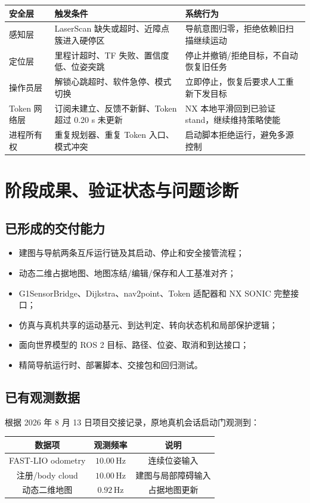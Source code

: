 \documentclass[11pt,a4paper,fontset=none]{ctexart}
\begin{document}
\begin{tabularx}{\textwidth}{p{2.4cm} X X}
\toprule
安全层 & 触发条件 & 系统行为 \\
\midrule
感知层 & LaserScan 缺失或超时、近障点簇进入硬停区 & 导航意图归零，拒绝依赖旧扫描继续运动 \\
定位层 & 里程计超时、TF 失败、置信度低、位姿突跳 & 停止并撤销/拒绝目标，不自动恢复旧任务 \\
操作员层 & 解锁心跳超时、软件急停、模式切换 & 立即停止，恢复后要求人工重新下发目标 \\
Token 网络层 & 订阅未建立、反馈不新鲜、Token 超过 0.20 s 未更新 & NX 本地平滑回到已验证 stand，继续维持策略使能 \\
进程所有权 & 重复规划器、重复 Token 入口、模式冲突 & 启动脚本拒绝运行，避免多源控制 \\
\bottomrule
\end{tabularx}

\section{阶段成果、验证状态与问题诊断}

\subsection{已形成的交付能力}

\begin{itemize}
  \item 建图与导航两条互斥运行链及其启动、停止和安全接管流程；
  \item 动态二维占据地图、地图冻结/编辑/保存和人工基准对齐；
  \item G1SensorBridge、Dijkstra、nav2point、Token 适配器和 NX SONIC 完整接口；
  \item 仿真与真机共享的运动基元、到达判定、转向状态机和局部保护逻辑；
  \item 面向世界模型的 ROS 2 目标、路径、位姿、取消和到达接口；
  \item 精简导航运行时、部署脚本、交接包和回归测试。
\end{itemize}

\subsection{已有观测数据}

根据 2026 年 8 月 13 日项目交接记录，原地真机会话启动门观测到：

\begin{center}
\begin{tabular}{ccc}
\toprule
数据项 & 观测频率 & 说明 \\
\midrule
FAST-LIO odometry & $10.00\,$Hz & 连续位姿输入 \\
注册/body cloud & $10.00\,$Hz & 建图与局部障碍输入 \\
动态二维地图 & $0.92\,$Hz & 占据地图更新 \\
\bottomrule
\end{tabular}
\end{center}
\end{document}

